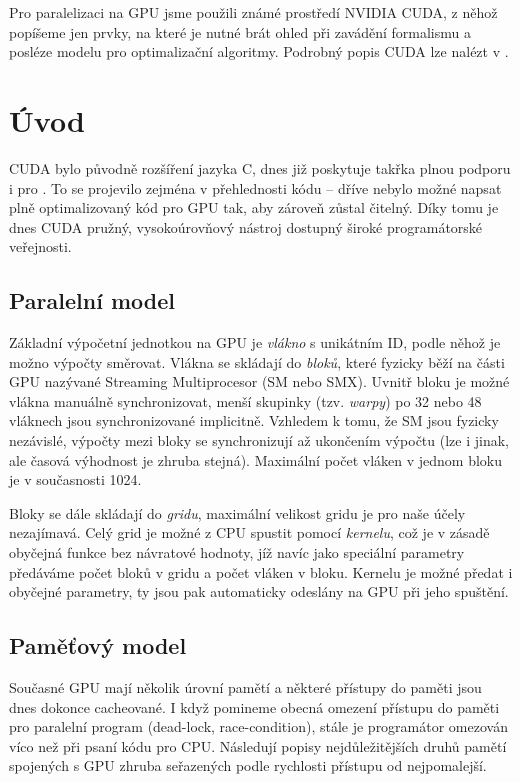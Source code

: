 
Pro paralelizaci na GPU jsme použili známé prostředí NVIDIA CUDA, z něhož popíšeme jen prvky, na které je nutné brát ohled při zavádění formalismu a posléze modelu pro optimalizační algoritmy. Podrobný popis CUDA lze nalézt v \cite{CUDA programming g.}.

\section{Úvod}

CUDA bylo původně rozšíření jazyka C, dnes již poskytuje takřka plnou podporu i pro \Cpp. To se projevilo zejména v přehlednosti kódu -- dříve nebylo možné napsat plně optimalizovaný kód pro GPU tak, aby zároveň zůstal čitelný. Díky tomu je dnes CUDA pružný, vysokoúrovňový nástroj dostupný široké programátorské veřejnosti. 

\subsection{Paralelní model}

Základní výpočetní jednotkou na GPU je \emph{vlákno} s unikátním ID, podle něhož je možno výpočty směrovat. Vlákna se skládají do \emph{bloků}, které fyzicky běží na části GPU nazývané Streaming Multiprocesor (SM nebo SMX). Uvnitř bloku je možné vlákna manuálně synchronizovat, menší skupinky (tzv. \emph{warpy}) po 32 nebo 48 vláknech jsou synchronizované implicitně. Vzhledem k tomu, že SM jsou fyzicky nezávislé, výpočty mezi bloky se synchronizují až ukončením výpočtu (lze i jinak, ale časová výhodnost je zhruba stejná). Maximální počet vláken v jednom bloku je v současnosti 1024.

Bloky se dále skládají do \emph{gridu}, maximální velikost gridu je pro naše účely nezajímavá. Celý grid je možné z CPU spustit pomocí \emph{kernelu}, což je v zásadě obyčejná funkce bez návratové hodnoty, jíž navíc jako speciální parametry předáváme počet bloků v gridu a počet vláken v bloku. Kernelu je možné předat i obyčejné parametry, ty jsou pak automaticky odeslány na GPU při jeho spuštění.

\subsection{Paměťový model}

Současné GPU mají několik úrovní pamětí a některé přístupy do paměti jsou dnes dokonce cacheované. I když pomineme obecná omezení přístupu do paměti pro paralelní program (dead-lock, race-condition), stále je programátor omezován víco než při psaní kódu pro CPU. Následují popisy nejdůležitějších druhů pamětí spojených s GPU zhruba seřazených podle rychlosti přístupu od nejpomalejší.

